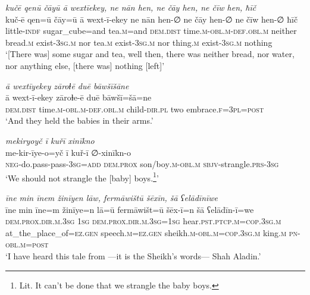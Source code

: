 \ea \label{ZB.29}
\textit{kučē qenū čāyū ā wextīekey, ne nān hen, ne čāy hen, ne čīw hen, ħīč} \\ 
\gll kuč-ē qen=ū čāy=ū ā wext-ī-ekey ne nān hen-∅ ne čāy hen-∅ ne čīw hen-∅ ħīč \\ 
 little\textsc{-indf} sugar\_cube=and tea\textsc{.m}=and \textsc{dem.dist} time\textsc{.m}\textsc{-obl}\textsc{.m}\textsc{-def}\textsc{.obl}\textsc{.m} neither bread\textsc{.m} exist\textsc{-3sg}\textsc{.m} nor tea\textsc{.m} exist\textsc{-3sg}\textsc{.m} nor thing\textsc{.m} exist\textsc{-3sg}\textsc{.m} nothing \\ 
\glt `[There was] some sugar and tea, well then, there was neither bread, nor water, nor anything else, [there was] nothing [left]'
\z 
 
\ea \label{ZB.32}
\textit{ā wextīyekey zāroɫē duē bāwšīšāne} \\ 
\gll ā wext-ī-ekey zāroɫe-ē duē bāwšī=šā=ne \\ 
 \textsc{dem.dist} time\textsc{.m}\textsc{-obl}\textsc{.m}\textsc{-def}\textsc{.obl}\textsc{.m} child\textsc{-dir}\textsc{.pl} two embrace\textsc{.f}\textsc{=3pl}\textsc{=\textsc{post}} \\ 
\glt `And they held the babies in their arms.'
\z 
 
\ea \label{ZB.35}
\textit{mekiryoyč ī kuřī xinīkno} \\ 
\gll me-kir-īye-o=yč ī kuř-ī ∅-xinīkn-o \\ 
 \textsc{neg-}do.pass-pass\textsc{-3sg}\textsc{=add} \textsc{dem.prox} son/boy\textsc{.m}\textsc{-obl}\textsc{.m} \textsc{sbjv}-strangle\textsc{.prs}\textsc{-3sg} \\ 
\glt `We should not strangle the [baby] boys.\footnote{Lit. It can't be done that we strangle the baby boys.}'
\z 
 
\ea \label{ZB.37}
\textit{īne min īnem žinīyen lāw, fermāwištū šēxīn, šā ʕelādīnīwe} \\ 
\gll īne min īne=m žinīye=n lā=ū fermāwišt=ū šēx-ī=n šā ʕelādīn-ī=we \\ 
 \textsc{dem.prox}\textsc{.dir}\textsc{.m}\textsc{.3sg} \textsc{1sg} \textsc{dem.prox}\textsc{.dir}\textsc{.m}\textsc{.3sg}\textsc{=\textsc{1sg}} hear\textsc{.pst}\textsc{.ptcp}\textsc{.m}\textsc{=cop}\textsc{.3sg}\textsc{.m} at\_the\_place\_of\textsc{\textsc{=ez.gen}} speech\textsc{.m}\textsc{\textsc{=ez.gen}} sheikh\textsc{.m}\textsc{-obl}\textsc{.m}\textsc{=cop}\textsc{.3sg}\textsc{.m} king\textsc{.m} \textsc{pn}\textsc{-obl}\textsc{.m}\textsc{=\textsc{post}} \\ 
\glt `I have heard this tale from —it is the Sheikh’s words— Shah Aladin.'
\z 
 
